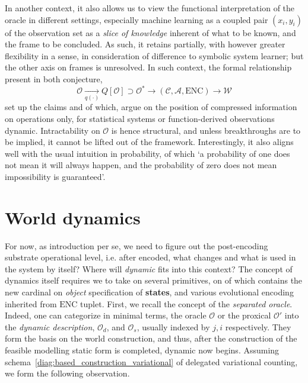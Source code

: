 In another context, it also allows us to view the functional interpretation of the oracle in different settings, especially machine learning as a coupled pair $(x_{i},y_{i})$ of the observation set as a \textit{slice of knowledge} inherent of what to be known, and the frame to be concluded. As such, it retains partially, with however greater flexibility in a sense, in consideration of difference to symbolic system learner; but the other axis on frames is unresolved. In such context, the formal relationship present in both conjecture, 
\begin{equation}
	\mathcal{O}\underset{q(\cdot)}{\longrightarrow}Q[\mathcal{O}] \supset \mathcal{O}^{*} \longrightarrow (\mathcal{C},\mathcal{A},\mathrm{ENC}) \longrightarrow \mathcal{W}
\end{equation}
set up the claims and of which, argue on the position of compressed information on operations only, for statistical systems or function-derived observations dynamic. Intractability on $\mathcal{O}$ is hence structural, and unless breakthroughs are to be implied, it cannot be lifted out of the framework. Interestingly, it also aligns well with the usual intuition in probability, of which `a probability of one does not mean it will always happen, and the probability of zero does not mean impossibility is guaranteed'. 
\section{World dynamics}

For now, as introduction per se, we need to figure out the post-encoding substrate operational level, i.e. after encoded, what changes and what is used in the system by itself? Where will \textit{dynamic} fits into this context? The concept of dynamics itself requires we to take on several primitives, on of which contains the new cardinal on \textit{object} specification of \textbf{states}, and various evolutional encoding inherited from $\mathrm{ENC}$ tuplet. First, we recall the concept of the \textit{separated oracle}. Indeed, one can categorize in minimal terms, the oracle $\mathcal{O}$ or the proxical $\mathcal{O}'$ into the \textit{dynamic description}, $\mathcal{O}_{d}$, and $\mathcal{O}_{s}$, usually indexed by $j,i$ respectively. They form the basis on the world construction, and thus, after the construction of the feasible modelling static form is completed, dynamic now begins. Assuming schema~\ref{diag:based_construction_variational} of delegated variational counting, we form the following observation. 

